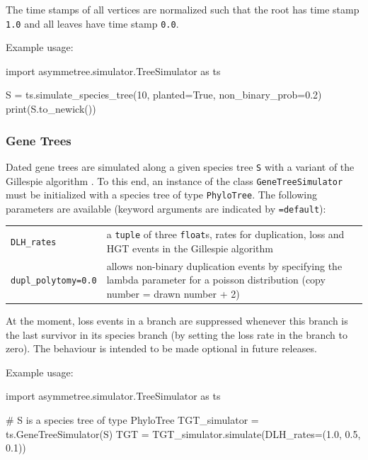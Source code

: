 \documentclass[hidelinks,11pt]{article}
\begin{document}
The time stamps of all vertices are normalized such that the root has time stamp \texttt{1.0} and all leaves have time stamp \texttt{0.0}.

Example usage:
\vspace{2mm}
\begin{python}
import asymmetree.simulator.TreeSimulator as ts

S = ts.simulate_species_tree(10, planted=True, non_binary_prob=0.2)
print(S.to_newick())
\end{python}
\vspace{2mm}

\subsubsection{Gene Trees}

Dated gene trees are simulated along a given species tree \texttt{S} with a variant of the Gillespie algorithm \citep{gillespie1976}.
To this end, an instance of the class \texttt{GeneTreeSimulator} must be initialized with a species tree of type \texttt{PhyloTree}.
The following parameters are available (keyword arguments are indicated by \texttt{=default}):

\vspace{3mm}
\renewcommand{\arraystretch}{1.5}
\begin{tabularx}{0.95\textwidth} { >{\raggedright\arraybackslash}p{4cm} >{\raggedright\arraybackslash}X }
	\texttt{DLH\_rates} & a \texttt{tuple} of three \texttt{float}s, rates for duplication, loss and HGT events in the Gillespie algorithm\\
	\texttt{dupl\_polytomy=0.0}  & allows non-binary duplication events by specifying
	the lambda parameter for a poisson distribution (copy number = drawn number + 2)\\
\end{tabularx}
\vspace{3mm}

At the moment, loss events in a branch are suppressed whenever this branch is the last survivor in its species branch (by setting the loss rate in the branch to zero).
The behaviour is intended to be made optional in future releases.

Example usage:
\vspace{2mm}
\begin{python}
import asymmetree.simulator.TreeSimulator as ts

# S is a species tree of type PhyloTree
TGT_simulator = ts.GeneTreeSimulator(S)
TGT = TGT_simulator.simulate(DLH_rates=(1.0, 0.5, 0.1))
\end{python}
\vspace{2mm}
\end{document}
